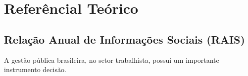 \section{Referêncial Teórico}
\subsection{Relação Anual de Informações Sociais (RAIS)}

A gestão pública brasileira, no setor trabalhista, possui um importante instrumento decisão.